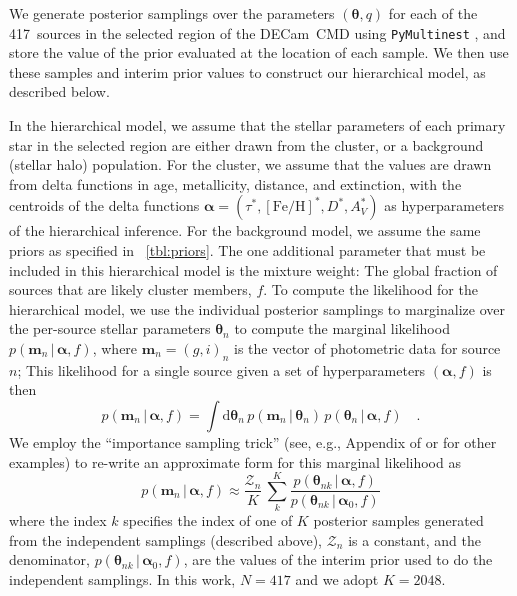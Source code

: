 \documentclass[twocolumn]{aastex62}
\newcommand{\decam}{DECam}
\newcommand{\bs}[1]{\boldsymbol{#1}}
\newcommand{\given}{\,|\,}
\newcommand{\dd}{\mathrm{d}}
\newcommand{\feh}{\ensuremath{[\textrm{Fe} / \textrm{H}]}}
\newcommand{\Nisofit}{417}
\begin{document}
We generate posterior samplings over the parameters $(\bs{\theta}, q)$ for each of the \Nisofit\ sources in the selected region of the \decam\ CMD using \texttt{PyMultinest} \citep{Buchner:2014, Feroz:2008, Feroz:2009}, and store the value of the prior evaluated at the location of each sample.
We then use these samples and interim prior values to construct our hierarchical model, as described below.

In the hierarchical model, we assume that the stellar parameters of each primary star in the selected region are either drawn from the cluster, or a background (stellar halo) population.
For the cluster, we assume that the values are drawn from delta functions in age, metallicity, distance, and extinction, with the centroids of the delta functions $\bs{\alpha} = (\tau^*, \feh^*, D^*, A_V^*)$ as hyperparameters of the hierarchical inference.
For the background model, we assume the same priors as specified in \tablename~\ref{tbl:priors}.
The one additional parameter that must be included in this hierarchical model is the mixture weight: The global fraction of sources that are likely cluster members, $f$.
To compute the likelihood for the hierarchical model, we use the individual posterior samplings to marginalize over the per-source stellar parameters $\bs{\theta}_n$ to compute the marginal likelihood $p(\bs{m}_n \given \bs{\alpha}, f)$, where $\bs{m}_n = (g, i)_n$ is the vector of photometric data for source $n$;
This likelihood for a single source given a set of hyperparameters $(\bs{\alpha}, f)$ is then
\begin{equation}
    p(\bs{m}_n \given \bs{\alpha}, f) = \int \dd \bs{\theta}_n \,
        p(\bs{m}_n \given \bs{\theta}_n) \,
        p(\bs{\theta}_n \given \bs{\alpha}, f) \quad .
\end{equation}
We employ the ``importance sampling trick'' (see, e.g., Appendix of \citealt{Price-Whelan:2018} or \citealt{Hogg:2010, Foreman-Mackey:2014} for other examples) to re-write an approximate form for this marginal likelihood as
\begin{equation}
    p(\bs{m}_n \given \bs{\alpha}, f) \approx \frac{\mathcal{Z}_n}{K} \,
        \sum_k^K \frac{p(\bs{\theta}_{nk} \given \bs{\alpha}, f)}{p(\bs{\theta}_{nk} \given \bs{\alpha}_0, f)}
        \label{eq:marglike}
\end{equation}
where the index $k$ specifies the index of one of $K$ posterior samples generated from the independent samplings (described above), $\mathcal{Z}_n$ is a constant, and the denominator, $p(\bs{\theta}_{nk} \given \bs{\alpha}_0, f)$, are the values of the interim prior used to do the independent samplings.
In this work, $N=\Nisofit$ and we adopt $K=2048$.
\end{document}
